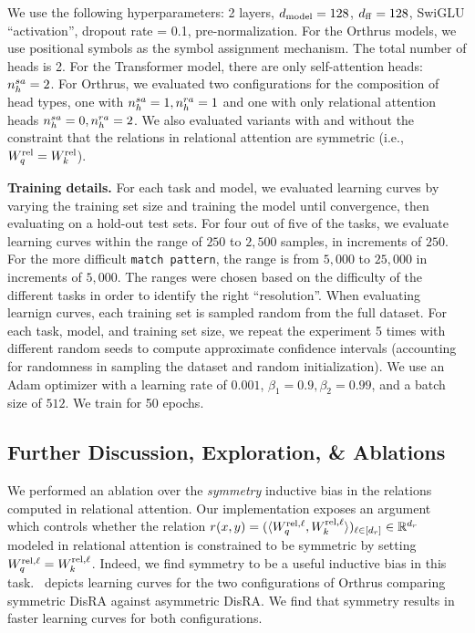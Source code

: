 We use the following hyperparameters: 2 layers, $d_{\mathrm{model}} = 128$, $d_{\mathrm{ff}} = 128$, SwiGLU ``activation'', dropout rate = 0.1, pre-normalization. For the Orthrus models, we use positional symbols as the symbol assignment mechanism. The total number of heads is 2. For the Transformer model, there are only self-attention heads: $n_h^{sa} = 2$. For Orthrus, we evaluated two configurations for the composition of head types, one with $n_h^{sa} = 1, n_h^{ra} = 1$ and one with only relational attention heads $n_h^{sa} = 0, n_h^{ra} = 2$. We also evaluated variants with and without the constraint that the relations in relational attention are symmetric (i.e., $W_q^{\mathrm{rel}} = W_k^{\mathrm{rel}}$).

\textbf{Training details.} For each task and model, we evaluated learning curves by varying the training set size and training the model until convergence, then evaluating on a hold-out test sets. For four out of five of the tasks, we evaluate learning curves within the range of $250$ to $2,500$ samples, in increments of $250$. For the more difficult \texttt{match pattern}, the range is from $5,000$ to $25,000$ in increments of $5,000$. The ranges were chosen based on the difficulty of the different tasks in order to identify the right ``resolution''. When evaluating learnign curves, each training set is sampled random from the full dataset. For each task, model, and training set size, we repeat the experiment 5 times with different random seeds to compute approximate confidence intervals (accounting for randomness in sampling the dataset and random initialization). We use an Adam optimizer with a learning rate of $0.001$, $\beta_1 = 0.9, \beta_2 = 0.99$, and a batch size of $512$. We train for 50 epochs.

\subsection*{Further Discussion, Exploration, \& Ablations}

We performed an ablation over the \textit{symmetry} inductive bias in the relations computed in relational attention. Our implementation exposes an argument which controls whether the relation $r(x, y) = (\langle W_q^{\mathrm{rel}, \ell}, W_k^{\mathrm{rel}, \ell} \rangle)_{\ell \in [d_r]} \in \mathbb{R}^{d_r}$ modeled in relational attention is constrained to be symmetric by setting $W_q^{\mathrm{rel}, \ell} = W_k^{\mathrm{rel}, \ell}$. Indeed, we find symmetry to be a useful inductive bias in this task.~ depicts learning curves for the two configurations of Orthrus comparing symmetric DisRA against asymmetric DisRA. We find that symmetry results in faster learning curves for both configurations.

